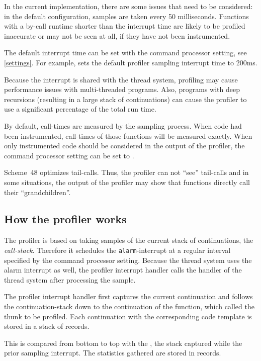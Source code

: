 In the current implementation, there are some issues that need to be considered:
in the default configuration, samples are taken every 50 milliseconds. Functions with a by-call
runtime shorter than the interrupt time are likely to be profiled inaccurate or may not be seen
at all, if they have not been instrumented.

The default interrupt time can be set with the  command processor setting,
see \ref{settings}. For example,  sets the
default profiler sampling interrupt time to 200ms.

Because the interrupt is shared with the thread system, profiling may cause performance issues
with multi-threaded programs. Also, programs with deep recursions (resulting in a large stack of
continuations) can cause the profiler to use a significant percentage of the total run time.

By default, call-times are measured by the sampling process. When code had been instrumented,
call-times of those functions will be measured exactly. When only instrumented code should be
considered in the output of the profiler, the command processor setting
 can be set to .

Scheme~48 optimizes tail-calls. Thus, the profiler can not ``see'' tail-calls and in some situations,
the output of the profiler may show that functions directly call their ``grandchildren''.


\subsection{How the profiler works}

The profiler is based on taking samples of the current stack of continuations, the {\it call-stack}.
Therefore it schedules the {\tt alarm}-interrupt at a regular interval specified by the
 command processor setting. Because the thread system uses the
alarm interrupt as well, the profiler interrupt handler
calls the handler of the thread system after processing the sample.

The profiler interrupt handler first captures the current continuation and follows the continuation-stack
down to the continuation of the  function, which called the thunk to be profiled.
Each continuation with the corresponding code template is stored in a stack of  records.

This  is compared from bottom to top with the ,
the stack captured while the prior sampling interrupt.
The statistics gathered are stored in  records.

